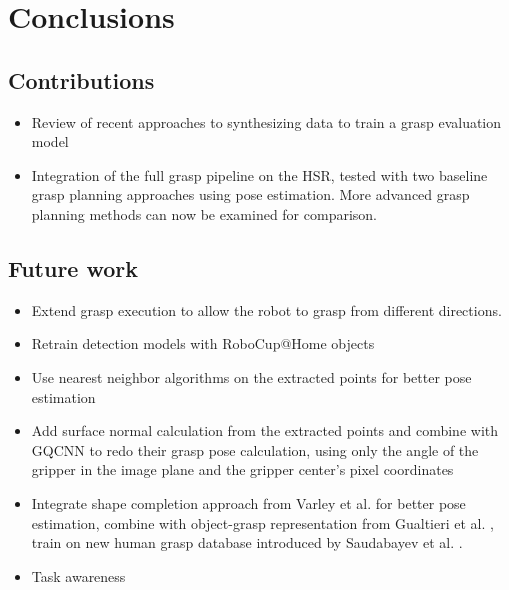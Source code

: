 
\chapter{Conclusions}


\section{Contributions}
\begin{itemize}
    \item Review of recent approaches to synthesizing data to train a grasp evaluation model
    \item Integration of the full grasp pipeline on the HSR, tested with two baseline grasp planning approaches using
    pose estimation. More advanced grasp planning methods can now be examined for comparison.
\end{itemize}


\section{Future work}
\begin{itemize}
    \item Extend grasp execution to allow the robot to grasp from different directions.
    \item Retrain detection models with RoboCup@Home objects
    \item Use nearest neighbor algorithms on the extracted points for better pose estimation
    \item Add surface normal calculation from the extracted points and combine with GQCNN to redo their grasp pose
    calculation, using only the angle of the gripper in the image plane and the gripper center's pixel coordinates
    \item Integrate shape completion approach from Varley et al. \cite{Varley2017} for better pose estimation, combine
    with object-grasp representation from Gualtieri et al. \cite{Gualtieri2016}, train on new human grasp database
    introduced by Saudabayev et al. \cite{Saudabayev2018}.
    \item Task awareness
\end{itemize}
